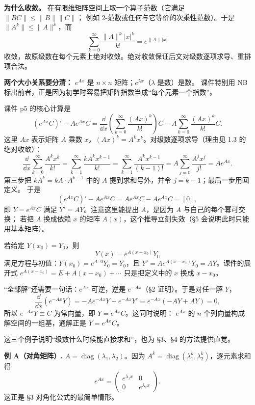 \documentclass[11pt]{ctexart}
\newcommand{\pmat}[1]{\begin{pmatrix}#1\end{pmatrix}}
\newcommand{\zero}{[0]}
\newcommand{\Ax}{Ax}
\begin{document}
\textbf{为什么收敛。} 在有限维矩阵空间上取一个算子范数（它满足 $\|BC\|\le\|B\|\|C\|$；
例如 $2$-范数或任何与它等价的次乘性范数）。于是 $\|A^k\|\le\|A\|^k$，而
\[
\sum_{k=0}^{\infty}\frac{\|A\|^k|x|^k}{k!}=e^{\|A\|\,|x|}
\]
收敛，故原级数在每个元素上绝对收敛。绝对收敛保证后文对级数逐项求导、重排项合法。

\textbf{两个大小关系要分清：} $e^{Ax}$ 是 $n\times n$ 矩阵；$e^{\lambda x}$（$\lambda$ 是数）是数。
课件特别用 NB 标出前者，正是因为初学时容易把矩阵指数当成“每个元素一个指数”。


课件 p5 的核心计算是
\[
\left(e^{Ax}C\right)'-Ae^{Ax}C
=\frac{\dd}{\dd x}\left(\sum_{k=0}^{\infty}\frac{(\Ax)^k}{k!}\right)C
-A\sum_{k=0}^{\infty}\frac{(\Ax)^k}{k!}C .
\]
这里 $\Ax$ 表示矩阵 $A$ 乘数 $x$，$(\Ax)^k=A^kx^k$。对级数逐项求导（理由见 1.3 的绝对收敛）：
\[
\frac{\dd}{\dd x}\sum_{k=0}^{\infty}\frac{A^kx^k}{k!}
=\sum_{k=1}^{\infty}\frac{kA^kx^{k-1}}{k!}
=\sum_{k=1}^{\infty}\frac{A^k x^{k-1}}{(k-1)!}
=A\sum_{j=0}^{\infty}\frac{A^jx^j}{j!}=Ae^{Ax}.
\]
第三步把 $kA^k=kA\cdot A^{k-1}$ 中的 $A$ 提到求和号外，并令 $j=k-1$；最后一步用回定义。
于是
\[
\left(e^{Ax}C\right)'-Ae^{Ax}C=Ae^{Ax}C-Ae^{Ax}C=\zero,
\]
即 $Y=e^{Ax}C$ 满足 $Y'=AY$。注意这里能提出 $A$，是因为 $A$ 与自己的每个幂可交换；
若把 $A$ 换成依赖 $x$ 的矩阵 $A(x)$，这个推导立刻失效（§5 会说明此时只能用基本矩阵）。


若给定 $Y(x_0)=Y_0$，则
\begin{equation}\label{eq:ivp}
Y(x)=e^{A(x-x_0)}Y_0
\end{equation}
满足方程与初值：$Y(x_0)=e^{A\cdot0}Y_0=Y_0$，且
$Y'=Ae^{A(x-x_0)}Y_0=AY$。课件的展开式
$e^{A(x-x_0)}=E+A(x-x_0)+\cdots$ 只是把定义中的 $x$ 换成 $x-x_0$。

“全部解”还需要一句话：$e^{Ax}$ 可逆，逆是 $e^{-Ax}$（§2 证明）。于是对任一解 $Y$，
\[
\frac{\dd}{\dd x}\left(e^{-Ax}Y\right)
=-Ae^{-Ax}Y+e^{-Ax}Y'
=e^{-Ax}(-AY+AY)=0,
\]
所以 $e^{-Ax}Y\equiv C$ 为常向量，即 $Y=e^{Ax}C$。这同时说明：
$e^{Ax}$ 的 $n$ 个列向量构成解空间的一组基，通解正是 $Y=e^{Ax}C$。


这三个例子说明“级数什么时候能直接求和”，也为 §3、§4 的方法提供直觉。

\textbf{例 A（对角矩阵）.} $A=\operatorname{diag}(\lambda_1,\lambda_2)$。因为
$A^k=\operatorname{diag}(\lambda_1^k,\lambda_2^k)$，逐元素求和得
\[
e^{Ax}=\pmat{e^{\lambda_1x}&0\\0&e^{\lambda_2x}}.
\]
这正是 §3 对角化公式的最简单情形。
\end{document}

